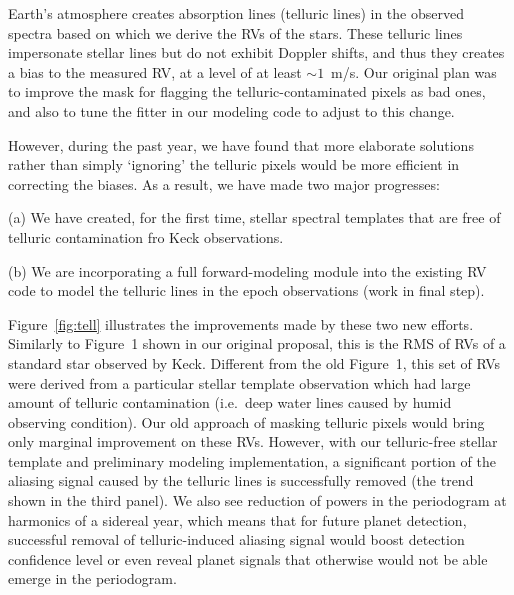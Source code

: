 \documentclass[12pt]{article}
\def\mps{m/s}
\begin{document}
Earth's atmosphere creates absorption lines (telluric lines) in the
observed spectra based on which we derive the RVs of the stars. These
telluric lines impersonate stellar lines but do not exhibit Doppler
shifts, and thus they creates a bias to the measured RV, at a level of
at least $\sim1$~\mps. Our original plan was to improve the mask for
flagging the telluric-contaminated pixels as bad ones, and also to
tune the fitter in our modeling code to adjust to this change.

However, during the past year, we have found that more elaborate
solutions rather than simply `ignoring' the telluric pixels would
be more efficient in correcting the biases. As a result, we have made
two major progresses:

(a) We have created, for the first time, stellar spectral templates
that are free of telluric contamination fro Keck observations.

(b) We are incorporating a full forward-modeling module into the
existing RV code to model the telluric lines in the epoch
observations (work in final step).

Figure~\ref{fig:tell} illustrates the improvements made by these two
new efforts. Similarly to Figure~1 shown in our original proposal,
this is the RMS of RVs of a standard star observed by Keck. Different
from the old Figure~1, this set of RVs were derived from a particular
stellar template observation which had large amount of telluric
contamination (i.e.\ deep water lines caused by humid observing
condition). Our old approach of masking telluric pixels would bring
only marginal improvement on these RVs. However, with our
telluric-free stellar template and preliminary modeling
implementation, a significant portion of the aliasing signal caused by
the telluric lines is successfully removed (the trend shown in the
third panel). We also see reduction of powers in the periodogram at
harmonics of a sidereal year, which means that for future planet
detection, successful removal of telluric-induced aliasing signal
would boost detection confidence level or even reveal planet signals
that otherwise would not be able emerge in the periodogram.
\end{document}
